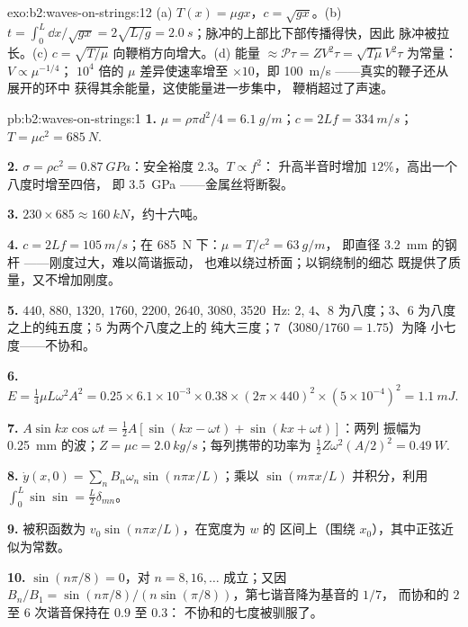 \begin{solution}{exo:b2:waves-on-strings:12}
(a) $T(x) = \mu gx$，$c = \sqrt{gx}$。(b) $t = \int_0^L\dd x/\sqrt{gx} = 2\sqrt{L/g} =
\qty{2.0}{s}$；脉冲的上部比下部传播得快，因此
脉冲被拉长。(c) $c = \sqrt{T/\mu}$ 向鞭梢方向增大。(d) 能量 $\approx
\mathcal P\tau = ZV^2\tau = \sqrt{T\mu}V^2\tau$ 为常量：$V \propto \mu^{-1/4}$；
$10^4$ 倍的 $\mu$ 差异使速率增至 $\times10$，即 \qty{100}{m/s} ——真实的鞭子还从展开的环中
获得其余能量，这使能量进一步集中，
鞭梢超过了声速。
\end{solution}

\begin{solution}{pb:b2:waves-on-strings:1}
\textbf{1.} $\mu = \rho\pi d^2/4 = \qty{6.1}{g/m}$；$c = 2Lf = \qty{334}{m/s}$；$T = \mu c^2
= \qty{685}{N}$.

\textbf{2.} $\sigma = \rho c^2 = \qty{0.87}{GPa}$：安全裕度 $2.3$。$T \propto f^2$：
升高半音时增加 $12\%$，高出一个八度时增至四倍，
即 \qty{3.5}{GPa} ——金属丝将断裂。

\textbf{3.} $230 \times 685 \approx \qty{160}{kN}$，约十六吨。

\textbf{4.} $c = 2Lf = \qty{105}{m/s}$；在 \qty{685}{N} 下：$\mu = T/c^2 = \qty{63}{g/m}$，
即直径 \qty{3.2}{mm} 的钢杆 ——刚度过大，难以简谐振动，
也难以绕过桥面；以铜绕制的细芯
既提供了质量，又不增加刚度。

\textbf{5.} $440$, $880$, $1320$, $1760$, $2200$, $2640$, $3080$, \qty{3520}{Hz}: $2$,
$4$、$8$ 为八度；$3$、$6$ 为八度之上的纯五度；$5$ 为两个八度之上的
纯大三度；$7$（$3080/1760 = 1.75$）为降
小七度——不协和。

\textbf{6.} $E = \tfrac14\mu L\omega^2A^2 = 0.25 \times 6.1 \times 10^{-3} \times 0.38 \times (2\pi
\times 440)^2 \times (5 \times 10^{-4})^2 = \qty{1.1}{mJ}$.

\textbf{7.} $A\sin kx\cos\omega t = \tfrac12A[\sin(kx - \omega t) + \sin(kx + \omega t)]$：两列
振幅为 \qty{0.25}{mm} 的波；$Z = \mu c = \qty{2.0}{kg/s}$；每列携带的功率为
$\tfrac12Z\omega^2(A/2)^2 = \qty{0.49}{W}$.

\textbf{8.} $\dot y(x, 0) = \sum_nB_n\omega_n\sin(n\pi x/L)$；乘以
$\sin(m\pi x/L)$ 并积分，利用 $\int_0^L\sin\sin = \tfrac L2\delta_{mn}$。

\textbf{9.} 被积函数为 $v_0\sin(n\pi x/L)$，在宽度为 $w$ 的
区间上（围绕 $x_0$），其中正弦近似为常数。

\textbf{10.} $\sin(n\pi/8) = 0$，对 $n = 8, 16, \dots$ 成立；又因 $B_n/B_1 =
\sin(n\pi/8)/(n\sin(\pi/8))$，第七谐音降为基音的 $1/7$，
而协和的 $2$ 至 $6$ 次谐音保持在 $0.9$ 至 $0.3$：
不协和的七度被驯服了。


\end{solution}

